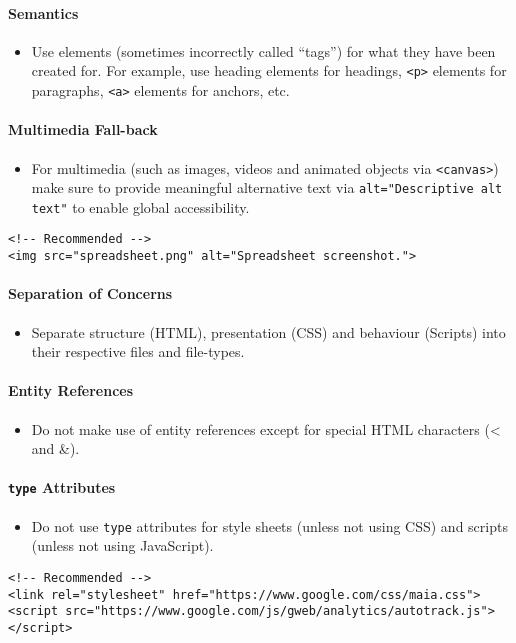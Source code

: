 \documentclass[a4paper, 11pt]{article}
\begin{document}
\paragraph{Semantics}
\begin{itemize}
\item Use elements (sometimes incorrectly called “tags”) for what they have been created for. For example, use heading elements for headings, \texttt{<p>} elements for paragraphs, \texttt{<a>} elements for anchors, etc.
\end{itemize}

\paragraph{Multimedia Fall-back}
\begin{itemize}
\item For multimedia (such as images, videos and animated objects via \texttt{<canvas>}) make sure to provide meaningful alternative text via \texttt{alt="Descriptive alt text"} to enable global accessibility.
\end{itemize}
\begin{verbatim}
<!-- Recommended -->
<img src="spreadsheet.png" alt="Spreadsheet screenshot.">
\end{verbatim}

\paragraph{Separation of Concerns}
\begin{itemize}
\item Separate structure (HTML), presentation (CSS) and behaviour (Scripts) into their respective files and file-types.
\end{itemize}

\paragraph{Entity References}
\begin{itemize}
\item Do not make use of entity references except for special HTML characters (< and \&).
\end{itemize}

\paragraph{\texttt{type} Attributes}
\begin{itemize}
\item Do not use \texttt{type} attributes for style sheets (unless not using CSS) and scripts (unless not using JavaScript).
\end{itemize}
\begin{verbatim}
<!-- Recommended -->
<link rel="stylesheet" href="https://www.google.com/css/maia.css">
<script src="https://www.google.com/js/gweb/analytics/autotrack.js"></script>
\end{verbatim}
\end{document}
